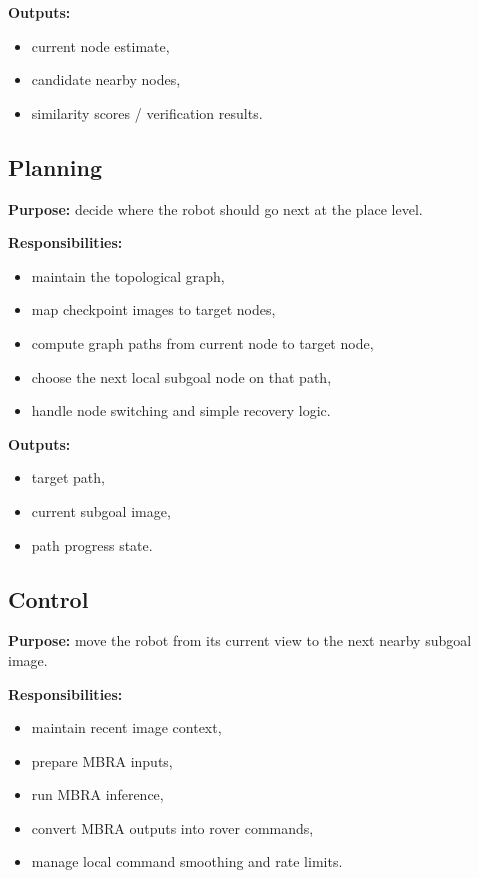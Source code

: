 \documentclass[11pt,a4paper]{article}
\begin{document}
\textbf{Outputs:}
\begin{itemize}[nosep]
  \item current node estimate,
  \item candidate nearby nodes,
  \item similarity scores / verification results.
\end{itemize}


\subsection{Planning}

\textbf{Purpose:} decide where the robot should go next at the place level.

\textbf{Responsibilities:}
\begin{itemize}[nosep]
  \item maintain the topological graph,
  \item map checkpoint images to target nodes,
  \item compute graph paths from current node to target node,
  \item choose the next local subgoal node on that path,
  \item handle node switching and simple recovery logic.
\end{itemize}

\textbf{Outputs:}
\begin{itemize}[nosep]
  \item target path,
  \item current subgoal image,
  \item path progress state.
\end{itemize}


\subsection{Control}

\textbf{Purpose:} move the robot from its current view to the next nearby
subgoal image.

\textbf{Responsibilities:}
\begin{itemize}[nosep]
  \item maintain recent image context,
  \item prepare MBRA inputs,
  \item run MBRA inference,
  \item convert MBRA outputs into rover commands,
  \item manage local command smoothing and rate limits.
\end{itemize}
\end{document}
